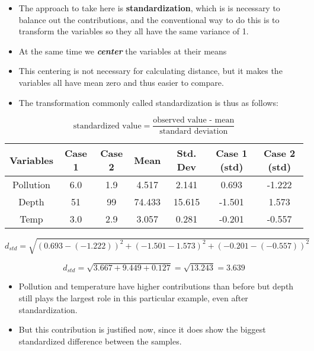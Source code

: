 \documentclass[12pt]{article}
\begin{document}
\begin{itemize}
\item The approach to take here is \textbf{standardization}, which is is necessary to balance out the contributions, and the
conventional way to do this is to transform the variables so they all have the same variance
of 1. 
\item At the same time we \textbf{\textit{center}} the variables at their means
\item This centering is not
necessary for calculating distance, but it makes the variables all have mean zero and thus
easier to compare. 

\item  The transformation commonly called standardization is thus as follows:
\end{itemize}


\[\mbox{standardized value} = \frac{\mbox{observed value - mean}}{ \mbox{standard deviation}}\]
\begin{center}
	\begin{tabular}{|c|c|c|c|c|c|c|}
		\hline
		Variables & Case 1 & Case 2 & Mean & Std. Dev & Case 1 (std) & Case 2 (std) \\ \hline
		Pollution & 6.0 & 1.9 & 4.517	&	2.141	&	0.693	&	-1.222	\\
		Depth & 51 & 99 & 74.433	&	15.615	&	-1.501	&	1.573	\\
		Temp & 3.0 & 2.9 & 3.057	&	0.281	&	-0.201	&	-0.557	\\
		\hline
	\end{tabular}
\end{center}

\[ d_{std} =  \sqrt{(0.693 - (- 1.222))^2 + (-1.501-1.573)^2 + (-0.201-(-0.557))^2} \]

\[ d_{std} = \sqrt{3.667 + 9.449 + 0.127} = \sqrt{13.243} = 3.639 \]
\newpage
\begin{itemize}
\item Pollution and temperature have higher contributions than before but depth still plays the
largest role in this particular example, even after standardization. 
\item But this contribution is
justified now, since it does show the biggest standardized difference between the samples. 

\end{itemize}
\newpage
\end{document}
